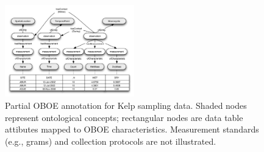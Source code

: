\begin{figure}
\centering
\includegraphics[width=0.5\textwidth]{images/kelp-mass-model.png}
\caption{Partial OBOE annotation for Kelp sampling data. Shaded nodes represent ontological concepts; rectangular nodes are data table attibutes mapped to OBOE characteristics. Measurement standards (e.g., grams) and collection protocols are not illustrated.}
\label{fig:kelp-mass-model}
\end{figure}

